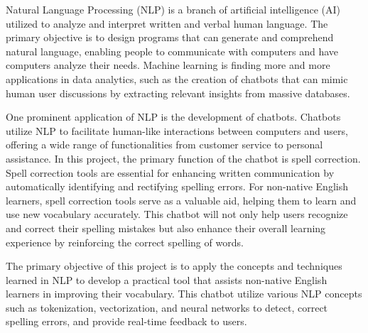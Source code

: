 \medskip

\hspace{10pt}Natural Language Processing (NLP) is a branch of artificial intelligence (AI) utilized to analyze and interpret written and verbal human language. The primary objective is to design programs that can generate and comprehend natural language, enabling people to communicate with computers and have computers analyze their needs. Machine learning is finding more and more applications in data analytics, such as the creation of chatbots that can mimic human user discussions by extracting relevant insights from massive databases.

\medskip

\hspace{10pt}One prominent application of NLP is the development of chatbots. Chatbots utilize NLP to facilitate human-like interactions between computers and users, offering a wide range of functionalities from customer service to personal assistance. In this project, the primary function of the chatbot is spell correction. Spell correction tools are essential for enhancing written communication by automatically identifying and rectifying spelling errors. For non-native English learners, spell correction tools serve as a valuable aid, helping them to learn and use new vocabulary accurately. This chatbot will not only help users recognize and correct their spelling mistakes but also enhance their overall learning experience by reinforcing the correct spelling of words.

\medskip

\hspace{10pt}The primary objective of this project is to apply the concepts and techniques learned in NLP to develop a practical tool that assists non-native English learners in improving their vocabulary. This chatbot utilize various NLP concepts such as tokenization, vectorization, and neural networks to detect, correct spelling errors, and provide real-time feedback to users.